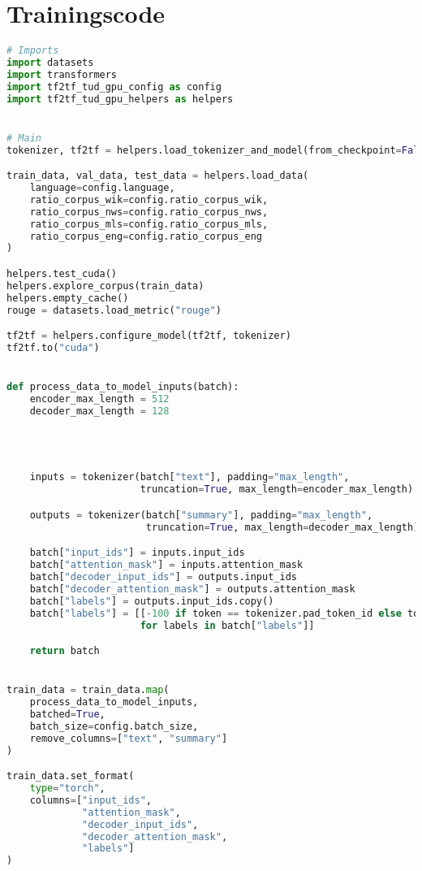 \section*{Trainingscode}
\begin{lstlisting}[language=Python, caption=Trainingscode]
# Imports
import datasets
import transformers
import tf2tf_tud_gpu_config as config
import tf2tf_tud_gpu_helpers as helpers


# Main
tokenizer, tf2tf = helpers.load_tokenizer_and_model(from_checkpoint=False)

train_data, val_data, test_data = helpers.load_data(
    language=config.language,
    ratio_corpus_wik=config.ratio_corpus_wik,
    ratio_corpus_nws=config.ratio_corpus_nws,
    ratio_corpus_mls=config.ratio_corpus_mls,
    ratio_corpus_eng=config.ratio_corpus_eng
)

helpers.test_cuda()
helpers.explore_corpus(train_data)
helpers.empty_cache()
rouge = datasets.load_metric("rouge")

tf2tf = helpers.configure_model(tf2tf, tokenizer)
tf2tf.to("cuda")


def process_data_to_model_inputs(batch):
    encoder_max_length = 512
    decoder_max_length = 128




    inputs = tokenizer(batch["text"], padding="max_length",
                       truncation=True, max_length=encoder_max_length)

    outputs = tokenizer(batch["summary"], padding="max_length",
                        truncation=True, max_length=decoder_max_length)

    batch["input_ids"] = inputs.input_ids
    batch["attention_mask"] = inputs.attention_mask
    batch["decoder_input_ids"] = outputs.input_ids
    batch["decoder_attention_mask"] = outputs.attention_mask
    batch["labels"] = outputs.input_ids.copy()
    batch["labels"] = [[-100 if token == tokenizer.pad_token_id else token for token in labels]
                       for labels in batch["labels"]]

    return batch


train_data = train_data.map(
    process_data_to_model_inputs,
    batched=True,
    batch_size=config.batch_size,
    remove_columns=["text", "summary"]
)

train_data.set_format(
    type="torch",
    columns=["input_ids",
             "attention_mask",
             "decoder_input_ids",
             "decoder_attention_mask",
             "labels"]
)




\end{lstlisting}
